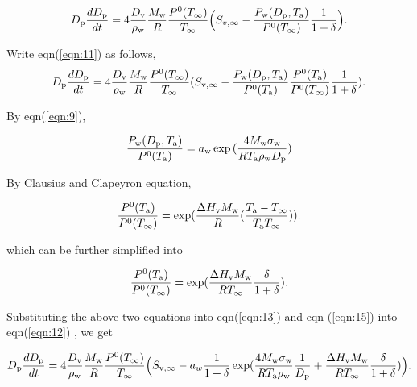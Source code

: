\documentclass[12pt]{article}
\begin{document}
\begin{equation}\label{eqn:11}
D_{\rm p}\frac{dD_{\rm p}}{dt}=4 \frac{D_{\rm v}} {\rho_{\rm w}} \frac{M_{\rm w}}{R} \frac{P^{\rm 0}(T_{\infty})} {T_{\infty}} \Big(S_{v, \infty} - \frac{P_{\rm w}(D_{\rm p}, T_{\rm a})}{P^{\rm 0}(T_{\infty})} \frac{1}{1+\delta}\Big).
\end{equation}

Write eqn(\ref{eqn:11}) as follows,
\begin{equation}\label{eqn:12}
D_{\rm p}\frac{dD_{\rm p}}{dt}=4 \frac{D_{\rm v}} {\rho_{\rm w}} \frac{M_{\rm w}}{R} \frac{P^{\rm 0}(T_{\infty})} {T_{\infty}} (S_{\rm v, \infty} - \frac{P_{\rm w}(D_{\rm p}, T_{\rm a})}{P^{\rm 0}(T_{\rm a})} \frac{P^{\rm 0}(T_{\rm a})}{P^{\rm 0}(T_{\infty})}\frac{1}{1+\delta}).
\end{equation}

By eqn(\ref{eqn:9}), 

\begin{equation}\label{eqn:13}
\frac{P_{\rm w}(D_{\rm p}, T_{\rm a})}{P^{\rm 0}(T_{\rm a})}=a_{\rm w}\exp{(\frac{4 M_{\rm w} \sigma_{\rm w}}{R T_{\rm a} \rho_{\rm w}D_{\rm p}})}\end{equation}

By Clausius and Clapeyron equation,

\begin{equation}\label{eqn:14}
\frac{P^{\rm 0}(T_{\rm a})}{P^{\rm 0}(T_{\infty})}=\exp (\frac{\Delta H_{\rm v} M_{\rm w}}{R} (\frac{T_{\rm a}-T_{\infty}}{T_{\rm a} T_{\infty}})).
\end{equation}

which can be further simplified into 

\begin{equation}\label{eqn:15}
\frac{P^{\rm 0}(T_{\rm a})}{P^{\rm 0}(T_{\infty})}=\exp (\frac{\Delta H_{\rm v} M_{\rm w}}{R T_{\infty}} \frac{\delta}{1+\delta}).
\end{equation}

Substituting the above two equations into eqn(\ref{eqn:13}) and eqn (\ref{eqn:15}) into eqn(\ref{eqn:12}) , we get

\begin{equation}\label{eqn:16}
D_{\rm p}\frac{dD_{\rm p}}{dt}=4 \frac{D_{\rm v}} {\rho_{\rm w}} \frac{M_{\rm w}}{R} \frac{P^{\rm 0}(T_{\infty})} {T_{\infty}} \Big(S_{\rm v, \infty} - a_{w} \frac{1}{1+\delta} \exp(\frac{4 M_{\rm w}\sigma_{\rm w}}{R T_{\rm a} \rho_{\rm w}}\frac{1}{D_{\rm p}}+\frac{\Delta H_{\rm v} M_{\rm w}}{R T_{\infty}} \frac{\delta}{1+\delta})\Big).
\end{equation}
\end{document}
